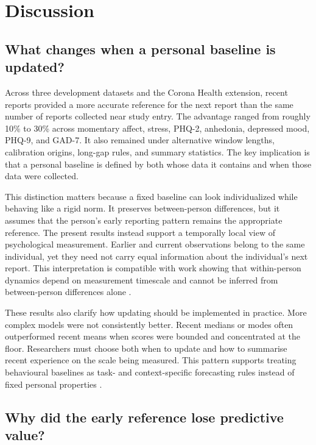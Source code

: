 \documentclass[pdflatex,sn-vancouver-num]{sn-jnl}
\begin{document}
\section{Discussion}

\subsection{What changes when a personal baseline is updated?}

Across three development datasets and the Corona Health extension, recent reports provided a more accurate reference for the next report than the same number of reports collected near study entry. The advantage ranged from roughly 10\% to 30\% across momentary affect, stress, PHQ-2, anhedonia, depressed mood, PHQ-9, and GAD-7. It also remained under alternative window lengths, calibration origins, long-gap rules, and summary statistics. The key implication is that a personal baseline is defined by both whose data it contains and when those data were collected.

This distinction matters because a fixed baseline can look individualized while behaving like a rigid norm. It preserves between-person differences, but it assumes that the person's early reporting pattern remains the appropriate reference. The present results instead support a temporally local view of psychological measurement. Earlier and current observations belong to the same individual, yet they need not carry equal information about the individual's next report. This interpretation is compatible with work showing that within-person dynamics depend on measurement timescale and cannot be inferred from between-person differences alone \cite{ref4,ref5,ref6}.

These results also clarify how updating should be implemented in practice. More complex models were not consistently better. Recent medians or modes often outperformed recent means when scores were bounded and concentrated at the floor. Researchers must choose both when to update and how to summarise recent experience on the scale being measured. This pattern supports treating behavioural baselines as task- and context-specific forecasting rules instead of fixed personal properties \cite{ref20}.

\subsection{Why did the early reference lose predictive value?}
\end{document}
